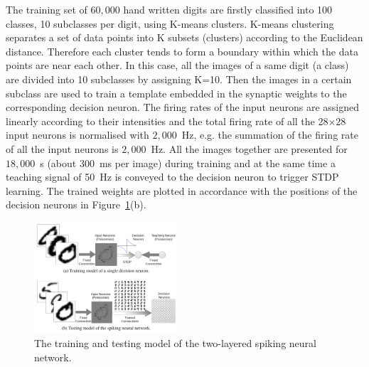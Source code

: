 \documentclass{frontiersENG} %
\begin{document}
The training set of $60,000$ hand written digits are firstly classified into 100 classes, 10 subclasses per digit, using K-means clusters.
K-means clustering separates a set of data points into K subsets (clusters) according to the Euclidean distance.
Therefore each cluster tends to form a boundary within which the data points are near each other.
In this case, all the images of a same digit (a class) are divided into 10 subclasses by assigning K=10.
Then the images in a certain subclass are used to train a template embedded in the synaptic weights to the corresponding decision neuron.
The firing rates of the input neurons are assigned linearly according to their intensities and the total firing rate of all the 28$\times$28 input neurons is normalised with $2,000$~Hz, e.g. the summation of the firing rate of all the input neurons is $2,000$~Hz.
All the images together are presented for $18,000$~s (about 300~ms per image) during training and at the same time a teaching signal of 50~Hz is conveyed to the decision neuron to trigger STDP learning.
The trained weights are plotted in accordance with the positions of the decision neurons in Figure~\ref{fig:model}(b).
\begin{figure}[thb!]
	\centering
%	
%	
	\includegraphics[width=0.48\textwidth]{fig6}
	\caption{The training and testing model of the two-layered spiking neural network.}
	\label{fig:model}
\end{figure} 
\end{document}
